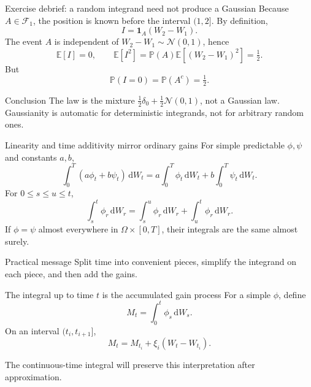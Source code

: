 \documentclass[10pt,aspectratio=169]{beamer}
\newcommand{\E}{\mathbb E}
\newcommand{\Pp}{\mathbb P}
\newcommand{\F}{\mathcal F}
\newcommand{\dd}{\,\mathrm d}
\begin{document}
\begin{frame}{Exercise debrief: a random integrand need not produce a Gaussian}
Because \(A\in\F_1\), the position is known before the interval \((1,2]\). By definition,
\[
I=\mathbf 1_A(W_2-W_1).
\]
The event \(A\) is independent of \(W_2-W_1\sim\mathcal N(0,1)\), hence
\[
\E[I]=0,
\qquad
\E[I^2]=\Pp(A)\E[(W_2-W_1)^2]=\tfrac12.
\]
But
\[
\Pp(I=0)=\Pp(A^c)=\tfrac12.
\]
\begin{block}{Conclusion}
The law is the mixture \(\frac12\delta_0+\frac12\mathcal N(0,1)\), not a Gaussian law. Gaussianity is automatic for deterministic integrands, not for arbitrary random ones.
\end{block}
\end{frame}

\begin{frame}{Linearity and time additivity mirror ordinary gains}
For simple predictable \(\phi,\psi\) and constants \(a,b\),
\[
\int_0^T(a\phi_t+b\psi_t)\dd W_t
=a\int_0^T\phi_t\dd W_t
+b\int_0^T\psi_t\dd W_t.
\]
For \(0\le s\le u\le t\),
\[
\int_s^t\phi_r\dd W_r
=\int_s^u\phi_r\dd W_r
+\int_u^t\phi_r\dd W_r.
\]
If \(\phi=\psi\) almost everywhere in \(\Omega\times[0,T]\), their integrals are the same almost surely.
\begin{block}{Practical message}
Split time into convenient pieces, simplify the integrand on each piece, and then add the gains.
\end{block}
\end{frame}

\begin{frame}{The integral up to time \(t\) is the accumulated gain process}
For a simple \(\phi\), define
\[
M_t=\int_0^t\phi_s\dd W_s.
\]
On an interval \((t_i,t_{i+1}]\),
\[
M_t=M_{t_i}+\xi_i(W_t-W_{t_i}).
\]
\begin{center}
\end{center}
The continuous-time integral will preserve this interpretation after approximation.
\end{frame}

\end{document}
